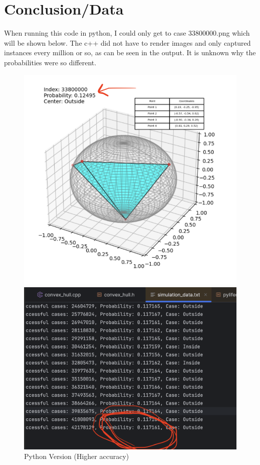 \documentclass{article}
\begin{document}
\section{Conclusion/Data}
When running this code in python, I could only get to case 33800000.png which will be shown below. The c++ did not have to render images and only captured instances every million or so, as can be seen in the output. It is unknown why the probabilities were so different.

\begin{figure}[H]
    \centering
    \begin{minipage}[b]{0.45\textwidth}
        \centering
        \includegraphics[width=\textwidth]{tetrahedron_33800000.png} 
        \caption{Python Version (Higher accuracy)}
        \label{fig:center_inside}
    \end{minipage}
    \hfill
    \begin{minipage}[b]{0.45\textwidth}
        \centering
        \includegraphics[width=\textwidth]{c++version.png} 

\end{minipage}
\end{figure}
\end{document}
